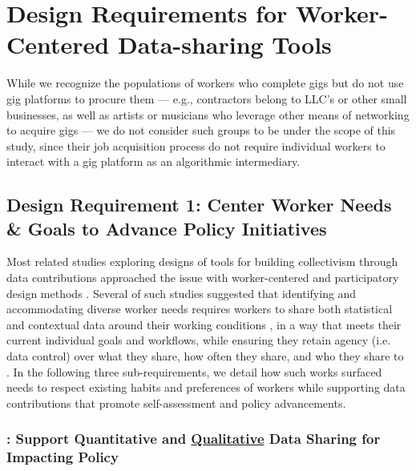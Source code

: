 \section{Design Requirements for Worker-Centered Data-sharing Tools}
\label{Related_Work_Design}
{ 
While we recognize the populations of workers who complete gigs but do not use gig platforms to procure them --- e.g., contractors belong to LLC's or other small businesses, as well as artists or musicians who leverage other means of networking to acquire gigs --- we do not consider such groups to be under the scope of this study, since their job acquisition process do not require individual workers to interact with a gig platform as an algorithmic intermediary.}

\subsection{{Design Requirement 1}: Center Worker {Needs \&} Goals {to Advance Policy Initiatives}} \label{DR1}
{Most related studies exploring designs of tools for building collectivism through data contributions approached the issue with worker-centered and participatory design methods \cite{stein2023you, zhang2023stakeholder, supporting}. Several of such studies suggested that identifying and accommodating diverse worker needs requires} workers to share both statistical and contextual data around their working conditions {\cite{hsieh2023designing, zhang2024data}}, in a way that meets their current individual goals and workflows, while ensuring they retain agency (i.e. data control) over what they share, how often they share, and who they share to {\cite{supporting, stein2023you}}. In the following three sub-requirements, we detail how {such works surfaced needs} to respect existing habits and preferences of workers while supporting data contributions that promote self-assessment and policy advancements.

\subsubsection*{: \textbf{Support Quantitative and \uline{Qualitative} Data Sharing} {for Impacting Policy}}


